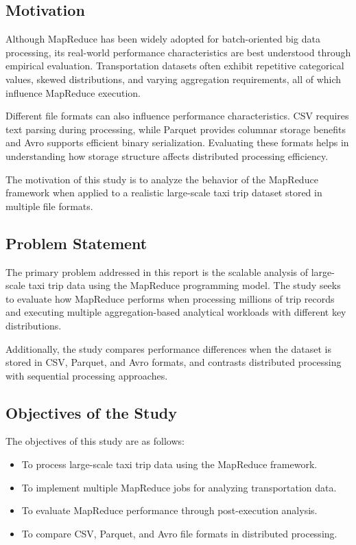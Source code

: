 \documentclass[12pt,a4paper]{report}
\begin{document}
\subsection{Motivation}

Although MapReduce has been widely adopted for batch-oriented big data processing,
its real-world performance characteristics are best understood through empirical
evaluation. Transportation datasets often exhibit repetitive categorical values, skewed
distributions, and varying aggregation requirements, all of which influence MapReduce
execution.

Different file formats can also influence performance characteristics. CSV requires text
parsing during processing, while Parquet provides columnar storage benefits and Avro
supports efficient binary serialization. Evaluating these formats helps in understanding
how storage structure affects distributed processing efficiency.

The motivation of this study is to analyze the behavior of the MapReduce framework
when applied to a realistic large-scale taxi trip dataset stored in multiple file formats.


\subsection{Problem Statement}

The primary problem addressed in this report is the scalable analysis of large-scale taxi
trip data using the MapReduce programming model. The study seeks to evaluate how
MapReduce performs when processing millions of trip records and executing multiple
aggregation-based analytical workloads with different key distributions.

Additionally, the study compares performance differences when the dataset is stored in
CSV, Parquet, and Avro formats, and contrasts distributed processing with sequential
processing approaches.


\subsection{Objectives of the Study}

The objectives of this study are as follows:

\begin{itemize}
    \item To process large-scale taxi trip data using the MapReduce framework.
    \item To implement multiple MapReduce jobs for analyzing transportation data.
    \item To evaluate MapReduce performance through post-execution analysis.
    \item To compare CSV, Parquet, and Avro file formats in distributed processing.
\end{itemize}
\end{document}
